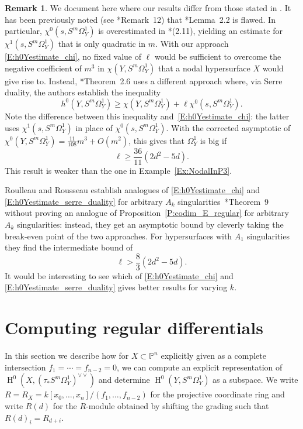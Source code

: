 \documentclass[12pt, reqno]{amsart}
\theoremstyle{definition}
\newtheorem{remark}[lemma]{Remark}
\newcommand{\PP}{{\mathbb P}}
\DeclareMathOperator{\HH}{H}
\numberwithin{equation}{section}
\numberwithin{table}{section}
\begin{document}
\begin{remark}
	\label{rem:BORR}
	We document here where our results differ from those stated in \cite{BO}.
	It has been previously noted (see \cite{RoulleauRousseau}*{Remark~12}) that \cite{BO}*{Lemma~2.2} is flawed. In particular, $\chi^0(s,S^m\Omega^1_Y)$ is overestimated in \cite{BO}*{(2.11)}, yielding an estimate for $\chi^1(s,S^m\Omega^1_Y)$ that is only quadratic in $m$. With our approach \eqref{E:h0Yestimate_chi}, no fixed value of $\ell$ would be sufficient to overcome the negative coefficient of $m^3$ in $\chi(Y,S^m\Omega^1_Y)$ that a nodal hypersurface $X$ would give rise to. Instead, \cite{BO}*{Theorem~2.6} uses a different approach where, via Serre duality, the authors establish the inequality
	\begin{equation}\label{E:h0Yestimate_serre_duality}h^0(Y,S^m\Omega^1_Y)\geq \chi(Y,S^m\Omega^1_Y)+\ell\chi^0(s,S^m\Omega^1_Y).\end{equation}
	Note the difference between this inequality and~\eqref{E:h0Yestimate_chi}: the latter uses $\chi^1(s,S^m\Omega^1_Y)$ in place of $\chi^0(s,S^m\Omega^1_Y)$.
	With the corrected asymptotic of $\chi^0(Y,S^m\Omega^1_Y)=\frac{11}{108}m^3+O(m^2)$, this gives that $\Omega^1_Y$ is big if
	\[\ell\geq \frac{36}{11}(2d^2-5d).\]
	This result is weaker than the one in Example~\ref{Ex:NodalInP3}.
	
	Roulleau and Rousseau establish analogues of \eqref{E:h0Yestimate_chi} and \eqref{E:h0Yestimate_serre_duality} for arbitrary $A_k$ singularities~\cite{RoulleauRousseau}*{Theorem~9} without proving an analogue of Proposition~\ref{P:codim_E_regular} for arbitrary $A_k$ singularities: instead, they get an asymptotic bound by cleverly taking the break-even point of the two approaches. For hypersurfaces with $A_1$ singularities they find the intermediate bound of 
	\[
	\ell > \frac{8}{3} (2d^2-5d).
	\]
	It would be interesting to see which of \eqref{E:h0Yestimate_chi} and \eqref{E:h0Yestimate_serre_duality} gives better results for varying $k$.
\end{remark}


\section{Computing regular differentials}
\label{S:comp_reg_diff}

In this section we describe how for $X\subset \PP^n$ explicitly given as a complete intersection $f_1=\cdots=f_{n-2}=0$, we can compute an explicit representation of
$\HH^0(X,(\tau_*S^m\Omega^1_Y)^{\vee\vee})$ and determine $\HH^0(Y,S^m\Omega^1_Y)$ as a subspace. We write $R=R_X=k[x_0,\ldots,x_n]/(f_1,\ldots,f_{n-2})$ for the projective coordinate ring and write $R(d)$ for the $R$-module obtained by shifting the grading such that $R(d)_i=R_{d+i}$.
\end{document}
